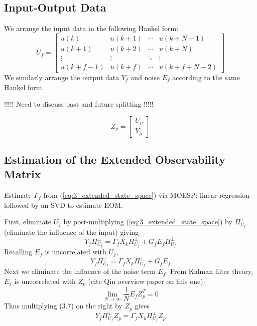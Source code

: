 \subsection{Input-Output Data}
We arrange the input data in the following Hankel form:
\begin{equation}\label{eq:3_input}
U_f = \begin{bmatrix}
u(k) & u(k+1) & \cdots & u(k+N-1)\\
u(k+1) & u(k+2) & \cdots & u(k+N)\\
\vdots & \vdots & \ddots & \vdots\\
u(k+f-1) & u(k+f) & \cdots & u(k+f+N-2)
\end{bmatrix}
\end{equation}
We similarly arrange the output data $Y_f$ and noise $E_f$ according to the same Hankel form.

!!!!! Need to discuss past and future splitting !!!!!

\begin{equation*}
Z_p = \begin{bmatrix} U_p\\ Y_p\end{bmatrix}
\end{equation*}

\subsection{Estimation of the Extended Observability Matrix}
Estimate $\Gamma_f$ from (\ref{eq:3_extended_state_space}) via MOESP: linear regression followed by an SVD to estimate EOM.

First, eliminate $U_f$ by post-multiplying (\ref{eq:3_extended_state_space}) by $\Pi_{U_f}^\perp$ (eliminate the influence of the input) giving
\begin{equation}
Y_f\Pi_{U_f}^\perp = \Gamma_f X_k\Pi_{U_f}^\perp + G_f E_f\Pi_{U_f}^\perp
\end{equation}
Recalling $E_f$ is uncorrelated with $U_f$, 
\begin{equation}
Y_f\Pi_{U_f}^\perp = \Gamma_f X_k\Pi_{U_f}^\perp + G_f E_f
\end{equation}
Next we eliminate the influence of the noise term $E_f$. From Kalman filter theory, $E_f$ is uncorrelated with $Z_p$ (cite Qin overview paper on this one):
\begin{equation*}
\lim_{N\rightarrow\infty}\frac{1}{N}E_fZ_p^T =0
\end{equation*}
Thus multiplying (3.7) on the right by $Z_p$ gives
\begin{equation}
Y_f\Pi_{U_f}^\perp Z_p = \Gamma_f X_k\Pi_{U_f}^\perp Z_p
\end{equation}


